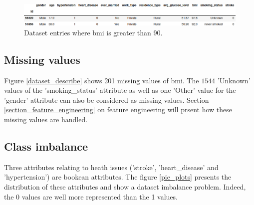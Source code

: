 \begin{figure}[H]
\centering
\includegraphics[scale=0.5]{figures/bmi_outliers_gt90.png}
\caption{Dataset entries where bmi is greater than 90.}
\label{large_bmi}
\end{figure}

\subsection{Missing values}
Figure \ref{dataset_describe} shows 201 missing values of bmi. The $1544$ 'Unknown' values of the 
'smoking\_status' attribute as well as one 'Other' value for the 'gender' attribute can also be 
considered as missing values. Section \ref{section_feature_engineering} on feature engineering will 
prsent how these missing values are handled.


\subsection{Class imbalance}
\label{section_imbalance}
Three attributes relating to heath issues ('stroke', 'heart\_disease' and 'hypertension') are 
bookean attributes. The figure \ref{pie_plots} presents the distribution of these attributes and 
show a dataset imbalance problem. Indeed, the 0 values are well more represented than the 1 values. 

